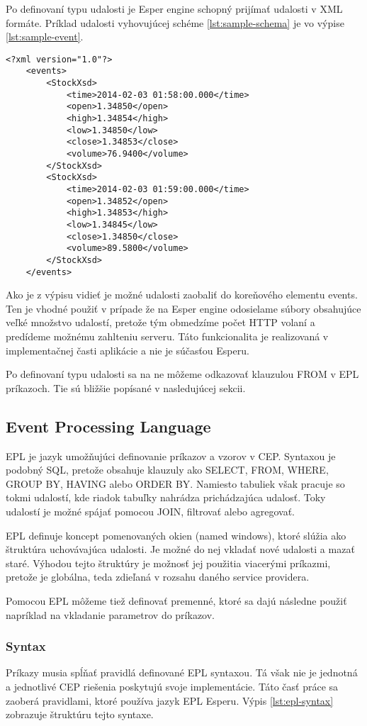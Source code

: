 	Po definovaní typu udalosti je Esper engine schopný prijímať udalosti v XML formáte. Príklad udalosti vyhovujúcej schéme \ref{lst:sample-schema} je vo výpise \ref{lst:sample-event}.
	\begin{lstlisting}[label=lst:sample-event,caption=Príklad XML udalosti]
	<?xml version="1.0"?>
	<events>
		<StockXsd>
			<time>2014-02-03 01:58:00.000</time>
			<open>1.34850</open>
			<high>1.34854</high>
			<low>1.34850</low>
			<close>1.34853</close>
			<volume>76.9400</volume>
		</StockXsd>
		<StockXsd>
			<time>2014-02-03 01:59:00.000</time>
			<open>1.34852</open>
			<high>1.34853</high>
			<low>1.34845</low>
			<close>1.34850</close>
			<volume>89.5800</volume>
		</StockXsd>
	</events>
	\end{lstlisting}
	Ako je z výpisu vidieť je možné udalosti zaobaliť do koreňového elementu events. Ten je vhodné použiť v prípade že na Esper engine odosielame súbory obsahujúce veľké množstvo udalostí, pretože tým obmedzíme počet HTTP volaní a predídeme možnému zahlteniu serveru. Táto funkcionalita je realizovaná v implementačnej časti aplikácie a nie je súčasťou Esperu.

	Po definovaní typu udalosti sa na ne môžeme odkazovať klauzulou FROM v EPL príkazoch. Tie sú bližšie popísané v nasledujúcej sekcii.

	\subsection{Event Processing Language}
		\ac{EPL} je jazyk umožňujúci definovanie príkazov a vzorov v CEP. Syntaxou je podobný SQL, pretože obsahuje klauzuly ako SELECT, FROM, WHERE, GROUP BY, HAVING alebo ORDER BY. Namiesto tabuliek však pracuje so tokmi udalostí, kde riadok tabuľky nahrádza prichádzajúca udalosť. Toky udalostí je možné spájať pomocou JOIN, filtrovať alebo agregovať.
		
		EPL definuje koncept pomenovaných okien (named windows), ktoré slúžia ako štruktúra uchovávajúca udalosti. Je možné do nej vkladať nové udalosti a mazať staré. Výhodou tejto štruktúry je možnosť jej použitia viacerými príkazmi, pretože je globálna, teda zdieľaná v rozsahu daného service providera.	
		
		Pomocou EPL môžeme tiež definovať premenné, ktoré sa dajú následne použiť napríklad na vkladanie parametrov do príkazov.
		
		\subsubsection{Syntax}
		Príkazy musia spĺňať pravidlá definované EPL syntaxou. Tá však nie je jednotná a jednotlivé CEP riešenia poskytujú svoje implementácie. Táto časť práce sa zaoberá pravidlami, ktoré používa jazyk EPL Esperu. Výpis \ref{lst:epl-syntax} zobrazuje štruktúru tejto syntaxe.
		
